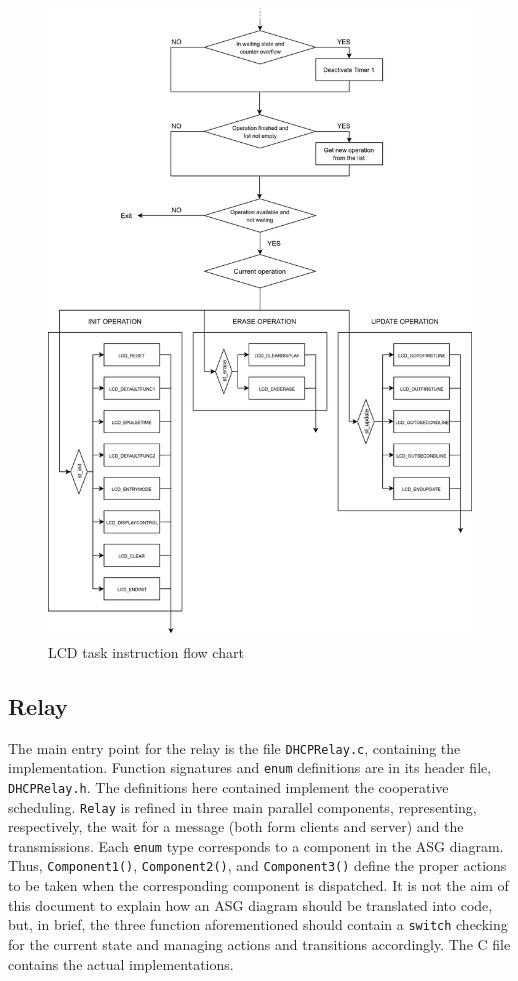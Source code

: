 \begin{figure}
	\centering
	\includegraphics[width=\linewidth]{images/lcdnonblocking2}
	\caption{LCD task instruction flow chart}
	\label{fig:lcdnonblocking2}
\end{figure}

\newpage
\subsection{Relay}
The main entry point for the relay is the file \texttt{DHCPRelay.c}, containing the implementation. Function signatures and \texttt{enum} definitions are in its header file, \texttt{DHCPRelay.h}. The definitions here contained implement the cooperative scheduling. \texttt{Relay} is refined in three main parallel components, representing, respectively, the wait for a message (both form clients and server) and the transmissions. Each \texttt{enum} type corresponds to a component in the ASG diagram. Thus, \texttt{Component1()}, \texttt{Component2()}, and \texttt{Component3()} define the proper actions to be taken when the corresponding component is dispatched. It is not the aim of this document to explain how an ASG diagram should be translated into code, but, in brief, the three function aforementioned should contain a \texttt{switch} checking for the current state and managing actions and transitions accordingly. The C file contains the actual implementations.

